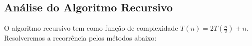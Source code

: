 \subsection{Análise do Algoritmo Recursivo}
O algoritmo recursivo tem como função de complexidade $T(n) = 2T(\frac{n}{2}) + n$. Resolveremos a recorrência pelos métodos abaixo:





